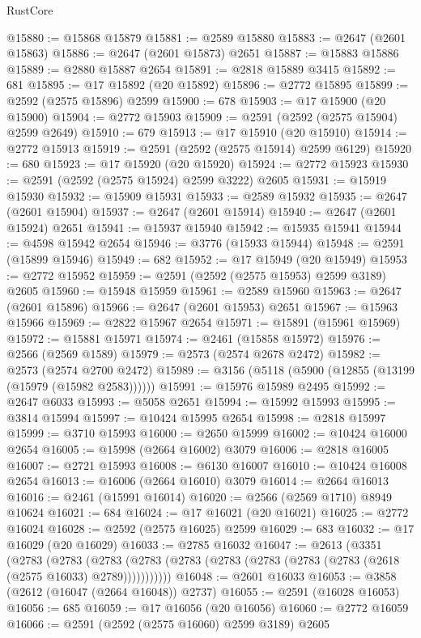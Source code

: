 \begin{lexlean}{RustCore}
\begin{coremodule}
@15880 := @15868 @15879
@15881 := @2589 @15880
@15883 := @2647 (@2601 @15863)
@15886 := @2647 (@2601 @15873) @2651
@15887 := @15883 @15886
@15889 := @2880 @15887 @2654
@15891 := @2818 @15889 @3415
@15892 := 681
@15895 := @17 @15892 (@20 @15892)
@15896 := @2772 @15895
@15899 := @2592 (@2575 @15896) @2599
@15900 := 678
@15903 := @17 @15900 (@20 @15900)
@15904 := @2772 @15903
@15909 := @2591 (@2592 (@2575 @15904) @2599 @2649)
@15910 := 679
@15913 := @17 @15910 (@20 @15910)
@15914 := @2772 @15913
@15919 := @2591 (@2592 (@2575 @15914) @2599 @6129)
@15920 := 680
@15923 := @17 @15920 (@20 @15920)
@15924 := @2772 @15923
@15930 := @2591 (@2592 (@2575 @15924) @2599 @3222) @2605
@15931 := @15919 @15930
@15932 := @15909 @15931
@15933 := @2589 @15932
@15935 := @2647 (@2601 @15904)
@15937 := @2647 (@2601 @15914)
@15940 := @2647 (@2601 @15924) @2651
@15941 := @15937 @15940
@15942 := @15935 @15941
@15944 := @4598 @15942 @2654
@15946 := @3776 (@15933 @15944)
@15948 := @2591 (@15899 @15946)
@15949 := 682
@15952 := @17 @15949 (@20 @15949)
@15953 := @2772 @15952
@15959 := @2591 (@2592 (@2575 @15953) @2599 @3189) @2605
@15960 := @15948 @15959
@15961 := @2589 @15960
@15963 := @2647 (@2601 @15896)
@15966 := @2647 (@2601 @15953) @2651
@15967 := @15963 @15966
@15969 := @2822 @15967 @2654
@15971 := @15891 (@15961 @15969)
@15972 := @15881 @15971
@15974 := @2461 (@15858 @15972)
@15976 := @2566 (@2569 @1589)
@15979 := @2573 (@2574 @2678 @2472)
@15982 := @2573 (@2574 @2700 @2472)
@15989 := @3156 (@5118 (@5900 (@12855 (@13199 (@15979 (@15982 @2583))))))
@15991 := @15976 @15989 @2495
@15992 := @2647 @6033
@15993 := @5058 @2651
@15994 := @15992 @15993
@15995 := @3814 @15994
@15997 := @10424 @15995 @2654
@15998 := @2818 @15997
@15999 := @3710 @15993
@16000 := @2650 @15999
@16002 := @10424 @16000 @2654
@16005 := @15998 (@2664 @16002) @3079
@16006 := @2818 @16005
@16007 := @2721 @15993
@16008 := @6130 @16007
@16010 := @10424 @16008 @2654
@16013 := @16006 (@2664 @16010) @3079
@16014 := @2664 @16013
@16016 := @2461 (@15991 @16014)
@16020 := @2566 (@2569 @1710) @8949 @10624
@16021 := 684
@16024 := @17 @16021 (@20 @16021)
@16025 := @2772 @16024
@16028 := @2592 (@2575 @16025) @2599
@16029 := 683
@16032 := @17 @16029 (@20 @16029)
@16033 := @2785 @16032
@16047 := @2613
    (@3351
      (@2783
        (@2783
          (@2783 (@2783 (@2783 (@2783 (@2783 (@2783 (@2783 (@2618 (@2575 @16033) @2789)))))))))))
@16048 := @2601 @16033
@16053 := @3858 (@2612 (@16047 (@2664 @16048)) @2737)
@16055 := @2591 (@16028 @16053)
@16056 := 685
@16059 := @17 @16056 (@20 @16056)
@16060 := @2772 @16059
@16066 := @2591 (@2592 (@2575 @16060) @2599 @3189) @2605

\end{coremodule}
\end{lexlean}
